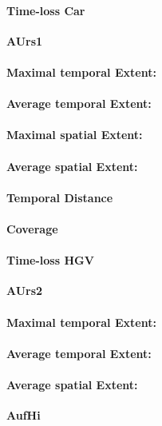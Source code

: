\paragraph{Time-loss Car}

\large
\centerline{\textbf{AUrs1}}
\normalsize

\paragraph{Maximal temporal Extent:}
\paragraph{Average temporal Extent:}
\paragraph{Maximal spatial Extent:}
\paragraph{Average spatial Extent:}
\paragraph{Temporal Distance}
\paragraph{Coverage}
\paragraph{Time-loss HGV}

\large
\centerline{\textbf{AUrs2}}
\normalsize

\paragraph{Maximal temporal Extent:}
\paragraph{Average temporal Extent:}
\paragraph{Average spatial Extent:}

\large
\centerline{\textbf{AufHi}}
\normalsize

